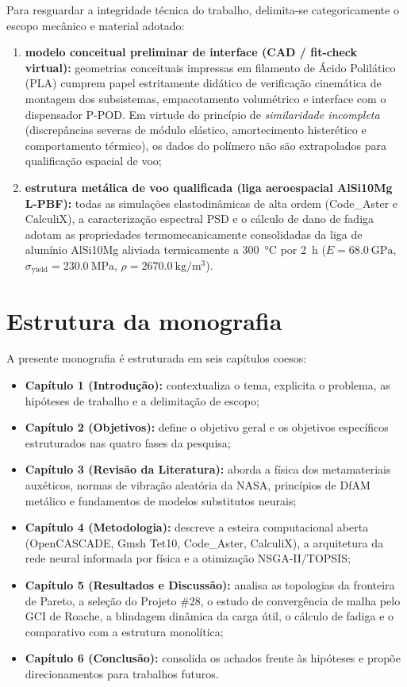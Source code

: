 Para resguardar a integridade técnica do trabalho, delimita-se categoricamente o escopo mecânico e material adotado:
\begin{enumerate}
  \item \textbf{modelo conceitual preliminar de interface (CAD / fit-check virtual):} geometrias conceituais impressas em filamento de Ácido Polilático (PLA) cumprem papel estritamente didático de verificação cinemática de montagem dos subsistemas, empacotamento volumétrico e interface com o dispensador P-POD. Em virtude do princípio de \textit{similaridade incompleta} (discrepâncias severas de módulo elástico, amortecimento histerético e comportamento térmico), os dados do polímero não são extrapolados para qualificação espacial de voo;
  \item \textbf{estrutura metálica de voo qualificada (liga aeroespacial AlSi10Mg L-PBF):} todas as simulações elastodinâmicas de alta ordem (Code\_Aster e CalculiX), a caracterização espectral PSD e o cálculo de dano de fadiga adotam as propriedades termomecanicamente consolidadas da liga de alumínio AlSi10Mg aliviada termicamente a \SI{300}{\celsius} por \SI{2}{\hour} ($E = \SI{68.0}{\giga\pascal}$, $\sigma_{\text{yield}} = \SI{230.0}{\mega\pascal}$, $\rho = \SI{2670.0}{\kilo\gram\per\cubic\metre}$).
\end{enumerate}

\section{Estrutura da monografia}
\label{sec:estrutura}

A presente monografia é estruturada em seis capítulos coesos:
\begin{itemize}
  \item \textbf{Capítulo 1 (Introdução):} contextualiza o tema, explicita o problema, as hipóteses de trabalho e a delimitação de escopo;
  \item \textbf{Capítulo 2 (Objetivos):} define o objetivo geral e os objetivos específicos estruturados nas quatro fases da pesquisa;
  \item \textbf{Capítulo 3 (Revisão da Literatura):} aborda a física dos metamateriais auxéticos, normas de vibração aleatória da NASA, princípios de DfAM metálico e fundamentos de modelos substitutos neurais;
  \item \textbf{Capítulo 4 (Metodologia):} descreve a esteira computacional aberta (OpenCASCADE, Gmsh Tet10, Code\_Aster, CalculiX), a arquitetura da rede neural informada por física e a otimização NSGA-II/TOPSIS;
  \item \textbf{Capítulo 5 (Resultados e Discussão):} analisa as topologias da fronteira de Pareto, a seleção do Projeto \#28, o estudo de convergência de malha pelo GCI de Roache, a blindagem dinâmica da carga útil, o cálculo de fadiga e o comparativo com a estrutura monolítica;
  \item \textbf{Capítulo 6 (Conclusão):} consolida os achados frente às hipóteses e propõe direcionamentos para trabalhos futuros.
\end{itemize}
